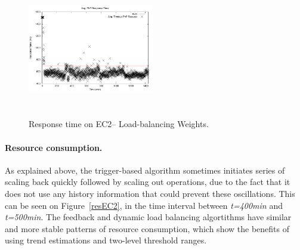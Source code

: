 \begin{figure}
\begin{center}
\includegraphics[width=0.49\textwidth, height=6cm]{./images/heterogeneous/avgTimeout_PhP_DLBweights}
\end{center}
\vspace{-5mm}
\caption{Response time on EC2-- Load-balancing Weights.}
\label{historyWeightEC2}
\end{figure}

\paragraph{Resource consumption.}
As explained above, the trigger-based algorithm sometimes initiates
series of scaling back quickly followed by scaling out operations, 
due to the fact that it does not use any history information that could
prevent these oscillations. This can be seen on Figure~\ref{resEC2},
in the time interval between \emph{t=400min} and \emph{t=500min}.
The feedback and dynamic load balancing algortithms have similar
and more stable patterns of resource consumption, which show the
benefits of using trend estimations and two-level threshold ranges.



